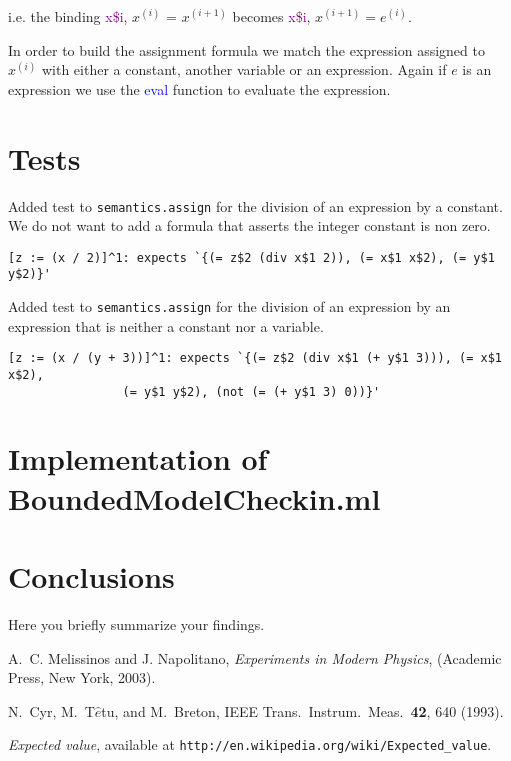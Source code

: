 \documentclass[letterpaper,12pt]{article}
\begin{document}
i.e. the binding \textcolor{purple}{x\$i}, $x^{(i)}$ = $x^{(i+1)}$ becomes \textcolor{purple}{x\$i}, $x^{(i+1)} = e^{(i)}$.

In order to build the assignment formula we match the expression assigned to $x^{(i)}$ with either a constant, another variable or an expression. Again if $e$ is an expression we use the \textcolor{blue}{eval} function to evaluate the expression.


\section{Tests}
Added test to \texttt{semantics.assign} for the division of an expression by a constant. We do not want to add a formula that asserts the integer constant is non zero.
\begin{verbatim}
[z := (x / 2)]^1: expects `{(= z$2 (div x$1 2)), (= x$1 x$2), (= y$1 y$2)}'
\end{verbatim}
Added test to \texttt{semantics.assign} for the division of an expression by an expression that is neither a constant nor a variable.
\begin{verbatim}
[z := (x / (y + 3))]^1: expects `{(= z$2 (div x$1 (+ y$1 3))), (= x$1 x$2),
				(= y$1 y$2), (not (= (+ y$1 3) 0))}'
\end{verbatim}

\section{Implementation of BoundedModelCheckin.ml}
\section{Conclusions}
Here you briefly summarize your findings.


\begin{thebibliography}{99}

A.~C. Melissinos and J. Napolitano, \textit{Experiments in Modern Physics},
(Academic Press, New York, 2003).

N.\ Cyr, M.\ T$\hat{e}$tu, and M.\ Breton,
IEEE Trans.\ Instrum.\ Meas.\ \textbf{42}, 640 (1993).

 \emph{Expected value},  available at
\texttt{http://en.wikipedia.org/wiki/Expected\_value}.

\end{thebibliography}
\end{document}

